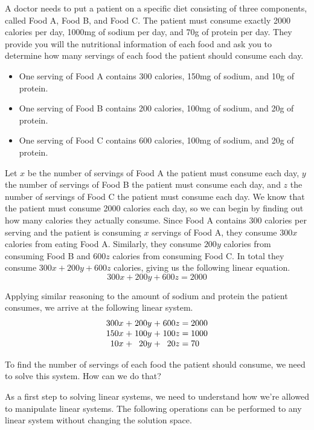 \begin{example}\label{ex:mixingfood}
	A doctor needs to put a patient on a specific diet consisting of three components, called Food A, Food B, and Food C. The patient must consume exactly 2000 calories per day, 1000mg of sodium per day, and 70g of protein per day. They provide you will the nutritional information of each food and ask you to determine how many servings of each food the patient should consume each day.
	\begin{itemize}
		\item One serving of Food A contains 300 calories, 150mg of sodium, and 10g of protein.
		\item One serving of Food B contains 200 calories, 100mg of sodium, and 20g of protein.
		\item One serving of Food C contains 600 calories, 100mg of sodium, and 20g of protein.
	\end{itemize}
	
	Let $x$ be the number of servings of Food A the patient must consume each day, $y$ the number of servings of Food B the patient must consume each day, and $z$ the number of servings of Food C the patient must consume each day. We know that the patient must consume 2000 calories each day, so we can begin by finding out how many calories they actually consume. Since Food A contains 300 calories per serving and the patient is consuming $x$ servings of Food A, they consume $300x$ calories from eating Food A. Similarly, they consume $200y$ calories from consuming Food B and $600z$ calories from consuming Food C. In total they consume $300x + 200y + 600z$ calories, giving us the following linear equation.
	$$300x + 200y + 600z = 2000$$
	
	Applying similar reasoning to the amount of sodium and protein the patient consumes, we arrive at the following linear system.
	\[
	\arraycolsep=1.4pt
	\begin{array}{rcrcrl}
		300x &+& 200y &+& 600z &= 2000\\
		150x &+& 100y &+& 100z &= 1000\\
		10x &+& 20y &+& 20z&= 70
	\end{array}
	\]
	
	To find the number of servings of each food the patient should consume, we need to solve this system. How can we do that?

\end{example}

As a first step to solving linear systems, we need to understand how we're allowed to manipulate linear systems. The following operations can be performed to any linear system without changing the solution space.

